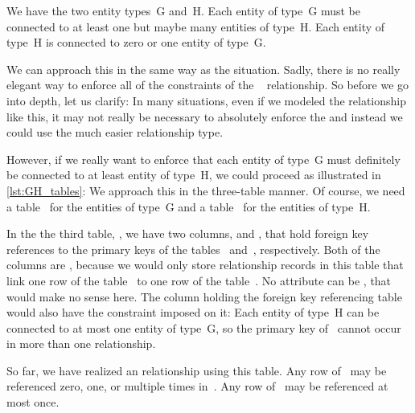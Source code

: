 %
%
%
%
%
%
%
We have the two entity types~G and~H.
Each entity of type~G must be connected to at least one but maybe many entities of type~H.
Each entity of type~H is connected to zero or one entity of type~G.

We can approach this in the same way as the  situation.
Sadly, there is no really elegant way to enforce all of the constraints of the ~ relationship.
So before we go into depth, let us clarify:
In many situations, even if we modeled the relationship like this, it may not really be necessary to absolutely enforce the  and instead we could use the much easier  relationship type.

However, if we really want to enforce that each entity of type~G must definitely be connected to at least entity of type~H, we could proceed as illustrated in \cref{lst:GH_tables}:
We approach this in the three-table manner.
Of course, we need a table~ for the entities of type~G and a table~ for the entities of type~H.

In the the third table, , we have two columns,  and , that hold foreign key references to the primary keys of the tables~ and~, respectively.
Both of the columns are , because we would only store relationship records in this table that link one row of the table~ to one row of the table~.
No attribute can be , that would make no sense here.
The column holding the foreign key referencing table~ would also have the  constraint imposed on it:
Each entity of type~H can be connected to at most one entity of type~G, so the primary key of~ cannot occur in more than one relationship.

So far, we have realized an  relationship using this table.
Any row of~ may be referenced zero, one, or multiple times in~.
Any row of~ may be referenced at most once.

